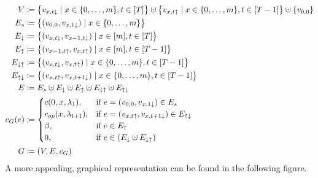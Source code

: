 \begin{align*}
	V&\coloneqq\bigl\{v_{x,t\downarrow}\mid x\in\fromto{0}{m},t\in[T]\bigr\}\dotcup\bigl\{v_{x,t\uparrow}\mid x\in\fromto{0}{m},t\in[T-1]\bigr\}\dotcup\{v_{0,0}\}\\
	E_s&\coloneqq\bigl\{(v_{0,0},v_{x,1\downarrow})\mid x\in\fromto{0}{m}\bigr\}\\
	E_\downarrow&\coloneqq\bigl\{(v_{x,t\downarrow},v_{x-1,t\downarrow})\mid x\in[m],t\in[T]\bigr\}\\
	E_\uparrow&\coloneqq\bigl\{(v_{x-1,t\uparrow},v_{x,t\uparrow})\mid x\in[m],t\in[T-1]\bigr\}\\
	E_{\downarrow\uparrow}&\coloneqq\bigl\{(v_{x,t\downarrow},v_{x,t\uparrow})\mid x\in\fromto{0}{m},t\in[T-1]\bigr\}\\
	E_{\uparrow\downarrow}&\coloneqq\bigl\{(v_{x,t\uparrow},v_{x,t+1\downarrow})\mid x\in\fromto{0}{m},t\in[T-1]\bigr\}\\
	E&\coloneqq E_s\dotcup E_\downarrow\dotcup E_\uparrow\dotcup E_{\downarrow\uparrow}\dotcup E_{\uparrow\downarrow}\\
	c_G(e)&\coloneqq
	\begin{cases}
		\costs(0,x,\lambda_1), & \text{if $e=(v_{0,0},v_{x,1\downarrow})\in E_s$}\\
		\opcosts(x,\lambda_{t+1}), & \text{if $e=(v_{x,t\uparrow},v_{x,t+1\downarrow})\in E_{\uparrow\downarrow}$}\\
		\beta, & \text{if $e\in E_\uparrow$}\\
		0, & \text{if $e\in(E_\downarrow\dotcup E_{\downarrow\uparrow})$}
	\end{cases}\\
	G&\coloneqq(V,E,c_G)
\end{align*}
A more appealing, graphical representation can be found in the following figure.
